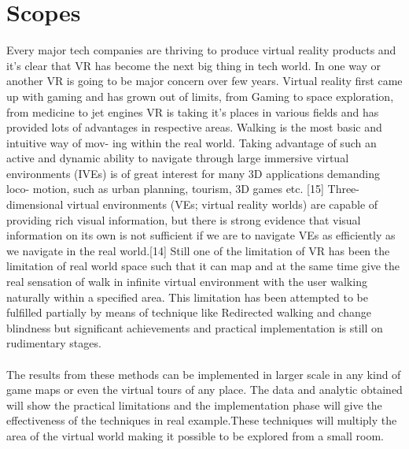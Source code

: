 \documentclass[12pt]{article}
\begin{document}
\clearpage
\section{Scopes}
Every major tech  companies are thriving to produce virtual reality products and it's clear that VR has become the next big thing in tech world. In one way or another VR is going to be major concern over few years. Virtual reality first came up with gaming and has grown out of limits, from Gaming to space exploration, from medicine to jet engines VR is taking it's places in various fields and has provided lots of advantages in respective areas. Walking is the most basic and intuitive way of mov- ing within the real world. Taking advantage of such an active and dynamic ability to navigate through large immersive virtual environments (IVEs) is of great interest for many 3D applications demanding loco- motion, such as urban planning, tourism, 3D games etc. [15] Three-dimensional virtual environments (VEs; virtual reality worlds) are capable of providing rich visual information, but there is strong evidence that visual information on its own is not sufficient if we are to navigate VEs as efficiently as we navigate in the real world.[14] Still one of the limitation of VR has been the limitation of real world space such that it can map and at the same time give the real sensation of walk in infinite virtual environment with the user walking naturally within a specified area. This limitation has been attempted to be fulfilled partially by means of technique like Redirected walking and change blindness but significant achievements and practical implementation is still on rudimentary stages.\\
\\The results from these methods can be implemented in larger scale in any kind of game maps or even the virtual tours of any place. The data and analytic  obtained will show the practical limitations and the implementation phase will give the effectiveness of the techniques in real example.These techniques will multiply the area of the virtual world making it possible to be explored from a small room. 
\clearpage
\end{document}
